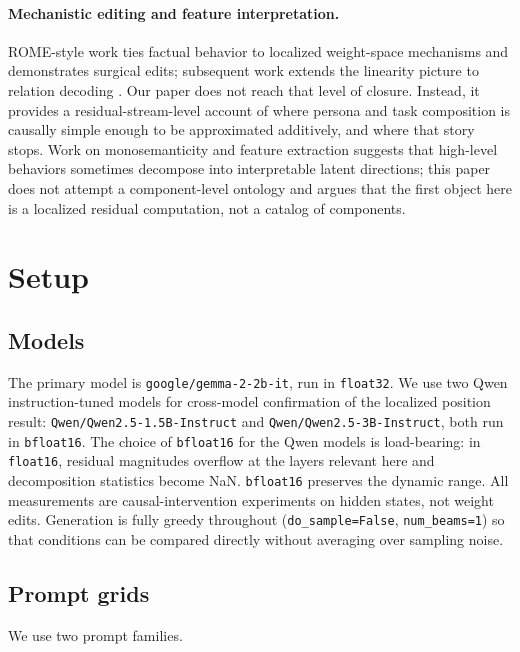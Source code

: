 \documentclass[11pt]{article}
\begin{document}
\paragraph{Mechanistic editing and feature interpretation.}
ROME-style work \cite{meng2022rome} ties factual behavior to localized weight-space mechanisms and demonstrates surgical edits; subsequent work extends the linearity picture to relation decoding \cite{hernandez2024linearity}. Our paper does not reach that level of closure. Instead, it provides a residual-stream-level account of where persona and task composition is causally simple enough to be approximated additively, and where that story stops. Work on monosemanticity and feature extraction \cite{anthropic2024monosemanticity} suggests that high-level behaviors sometimes decompose into interpretable latent directions; this paper does not attempt a component-level ontology and argues that the first object here is a localized residual computation, not a catalog of components.

\section{Setup}

\subsection{Models}

The primary model is \texttt{google/gemma-2-2b-it}, run in \texttt{float32}. We use two Qwen instruction-tuned models for cross-model confirmation of the localized position result: \texttt{Qwen/Qwen2.5-1.5B-Instruct} and \texttt{Qwen/Qwen2.5-3B-Instruct}, both run in \texttt{bfloat16}. The choice of \texttt{bfloat16} for the Qwen models is load-bearing: in \texttt{float16}, residual magnitudes overflow at the layers relevant here and decomposition statistics become NaN. \texttt{bfloat16} preserves the dynamic range. All measurements are causal-intervention experiments on hidden states, not weight edits. Generation is fully greedy throughout (\texttt{do\_sample=False}, \texttt{num\_beams=1}) so that conditions can be compared directly without averaging over sampling noise.

\subsection{Prompt grids}

We use two prompt families.
\end{document}
